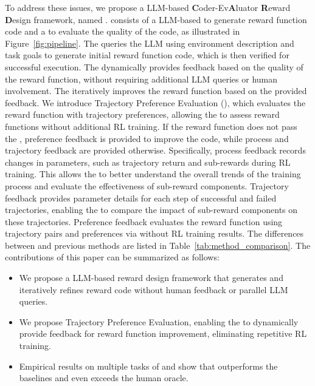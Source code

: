 \documentclass{article}
\theoremstyle{plain}
\theoremstyle{definition}
\theoremstyle{remark}
\begin{document}
To address these issues, we propose a LLM-based \textbf{C}oder-Ev\textbf{A}luator \textbf{R}eward \textbf{D}esign framework, named \ourmethod. \ourmethod consists of a LLM-based \designer to generate reward function code and a \critic to evaluate the quality of the code, as illustrated in Figure~\ref{fig:pipeline}.
The \designer queries the LLM using environment description and task goals to generate initial reward function code, which is then verified for successful execution. The \critic dynamically provides feedback based on the quality of the reward function, without requiring additional LLM queries or human involvement. The \designer iteratively improves the reward function based on the provided feedback. We introduce Trajectory Preference Evaluation (\TPE), which evaluates the reward function with trajectory preferences, allowing the \critic to assess reward functions without additional RL training. If the reward function does not pass the \TPE, preference feedback is provided to improve the code, while process and trajectory feedback are provided otherwise. Specifically, process feedback records changes in parameters, such as trajectory return and sub-rewards during RL training. This allows the \designer to better understand the overall trends of the training process and evaluate the effectiveness of sub-reward components. Trajectory feedback provides parameter details for each step of successful and failed trajectories, enabling the \designer to compare the impact of sub-reward components on these trajectories. Preference feedback evaluates the reward function using trajectory pairs and preferences via \TPE without RL training results. The differences between \ourmethod and previous methods are listed in Table~\ref{tab:method_comparison}.
The contributions of this paper can be summarized as follows:
\begin{itemize}
    \item We propose a LLM-based reward design framework that generates and iteratively refines reward code without human feedback or parallel LLM queries.
    \item We propose Trajectory Preference Evaluation, enabling the \critic to dynamically provide feedback for reward function improvement, eliminating repetitive RL training.
    \item Empirical results on multiple tasks of \MW and \MS show that \ourmethod outperforms the baselines and even exceeds the human oracle.
\end{itemize}
\end{document}

